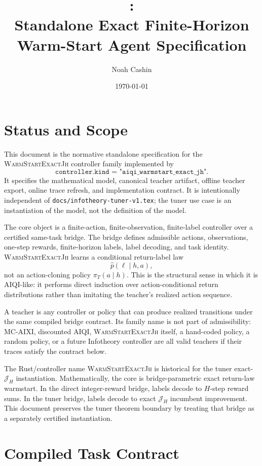 \documentclass[11pt]{article}
\title{\Warm:\\Standalone Exact Finite-Horizon Warm-Start Agent Specification}
\author{Noah Cashin}
\date{\today}
\newcommand{\Warm}{\textnormal{\textsc{WarmStartExactJh}}}
\newcommand{\Jh}{\mathcal{J}_H}
\begin{document}
\maketitle

\section{Status and Scope}
\label{sec:status}

This document is the normative standalone specification for the
\Warm{} controller family implemented by
\[
\texttt{controller.kind = "aiqi\_warmstart\_exact\_jh"}.
\]
It specifies the mathematical model, canonical teacher artifact, offline
teacher export, online trace refresh, and implementation contract. It is
intentionally independent of \texttt{docs/infotheory-tuner-v1.tex}; the tuner
use case is an instantiation of the model, not the definition of the model.

The core object is a finite-action, finite-observation, finite-label
controller over a certified same-task bridge. The bridge defines admissible
actions, observations, one-step rewards, finite-horizon labels, label decoding,
and task identity. \Warm{} learns a conditional return-label law
\[
\widehat p(\ell\mid h,a),
\]
not an action-cloning policy \(\pi_T(a\mid h)\). This is the structural sense
in which it is AIQI-like: it performs direct induction over action-conditional
return distributions rather than imitating the teacher's realized action
sequence.

A teacher is any controller or policy that can produce realized transitions
under the same compiled bridge contract. Its family name is not part of
admissibility: MC-AIXI, discounted AIQI, \Warm{} itself, a hand-coded policy,
a random policy, or a future Infotheory controller are all valid teachers if
their traces satisfy the contract below.

The Rust/controller name \Warm{} is historical for the tuner exact-\(\Jh\)
instantiation. Mathematically, the core is bridge-parametric exact return-law
warmstart. In the direct integer-reward bridge, labels decode to \(H\)-step
reward sums. In the tuner bridge, labels decode to exact \(\Jh\) incumbent
improvement. This document preserves the tuner theorem boundary by treating
that bridge as a separately certified instantiation.

\section{Compiled Task Contract}
\label{sec:task}
\end{document}
